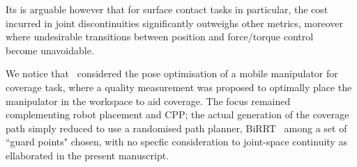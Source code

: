 \documentclass[journal]{IEEEtran}
\begin{document}
Its is arguable however that for surface contact tasks in particular, the cost incurred in joint discontinuities significantly 
outweighs other metrics, moreover where undesirable transitions between position and force/torque control~\cite{cheah2003brief}~\cite{heck2015switched}~\cite{mirrazavi2018a}~\cite{solanes2018adaptive}~\cite{Solanes2018Robust} become unavoidable. %


We notice that~\cite{paus2017a} considered the pose optimisation of a mobile manipulator for coverage task, 
where a quality measurement was proposed to optimally place the manipulator in the workspace to aid coverage. 
The focus remained complementing robot placement and CPP; the actual generation of the coverage path simply reduced to use 
a randomised path planner, BiRRT~\cite{LaValle2001Randomized} %
among a set of  ``guard points" chosen, with no specfic consideration to joint-space continuity as ellaborated in the present manuscript. 
\end{document}
